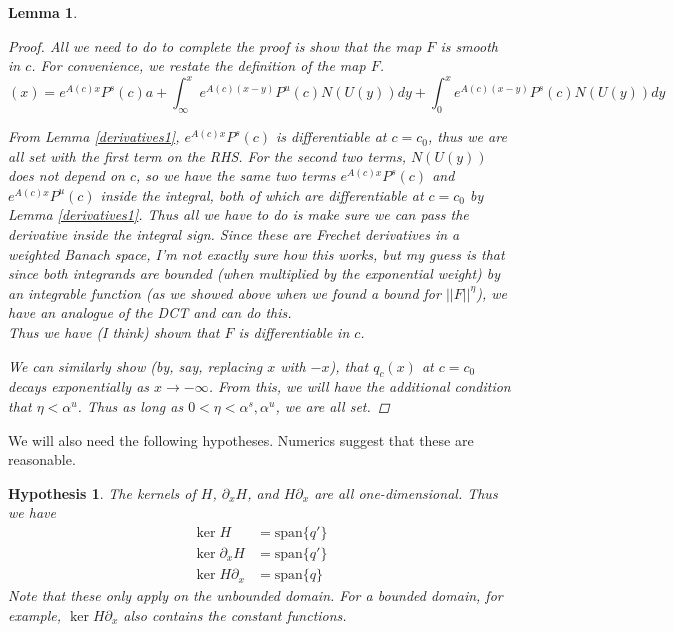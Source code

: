 \documentclass[12pt]{article}
\newtheorem{lemma}{Lemma}
\newtheorem{hypothesis}{Hypothesis}
\begin{document}
\begin{lemma}
\begin{proof}
All we need to do to complete the proof is show that the map $F$ is smooth in $c$. For convenience, we restate the definition of the map $F$.\\

\begin{equation}
[F(U, c, a)](x) = e^{A(c)x} P^s(c) a + \int_\infty^x e^{A(c)(x - y)}P^u(c) N(U(y))dy + \int_0^x e^{A(c)(x - y)}P^s(c) N(U(y))dy
\end{equation}

From Lemma \ref{derivatives1}, $e^{A(c)x} P^s(c)$ is differentiable at $c = c_0$, thus we are all set with the first term on the RHS. For the second two terms, $N(U(y))$ does not depend on $c$, so we have the same two terms $e^{A(c)x} P^s(c)$ and $e^{A(c)x} P^u(c)$ inside the integral, both of which are differentiable at $c = c_0$ by Lemma \ref{derivatives1}. Thus all we have to do is make sure we can pass the derivative inside the integral sign. Since these are Frechet derivatives in a weighted Banach space, I'm not exactly sure how this works, but my guess is that since both integrands are bounded (when multiplied by the exponential weight) by an integrable function (as we showed above when we found a bound for $||F||^\eta$), we have an analogue of the DCT and can do this.\\

Thus we have (I think) shown that $F$ is differentiable in $c$.

We can similarly show (by, say, replacing $x$ with $-x$), that $q_c(x)$ at $c = c_0$ decays exponentially as $x \rightarrow -\infty$. From this, we will have the additional condition that $\eta < \alpha^u$. Thus as long as $0 < \eta < \alpha^s, \alpha^u$, we are all set.

\end{proof}
\end{lemma}

We will also need the following hypotheses. Numerics suggest that these are reasonable.

\begin{hypothesis}\label{1dkernel}
The kernels of $H$, $\partial_x H$, and $H \partial_x$ are all one-dimensional. Thus we have
\begin{align*}
\ker H &= \text{span}\{ q' \} \\
\ker \partial_x H &= \text{span}\{ q' \} \\
\ker H \partial_x &= \text{span}\{ q \}
\end{align*}
Note that these only apply on the unbounded domain. For a bounded domain, for example, $\ker H \partial_x$ also contains the constant functions.
\end{hypothesis}
\end{document}
